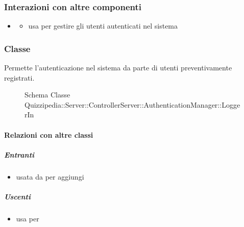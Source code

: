 \subsubsection{Interazioni con altre componenti}
\begin{itemize}
\item {}
\begin{itemize}
\item usa  per gestire gli utenti autenticati nel sistema
\end{itemize}
\end{itemize}
\subsubsection{Classe }
Permette l'autenticazione nel sistema da parte di utenti preventivamente registrati.
\begin{figure}[H]
\centering
\noindent{}
\caption[Schema Classe LoggerIn]{Schema Classe Quizzipedia::Server::ControllerServer::AuthenticationManager::LoggerIn}
\end{figure}
\paragraph{Relazioni con altre classi}
\subparagraph{Entranti}
\begin{itemize}
\item usata da  per aggiungi
\end{itemize}
\subparagraph{Uscenti}
\begin{itemize}
\item usa  per 
\end{itemize}

